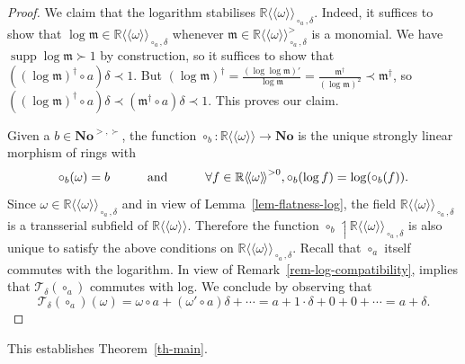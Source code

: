 \documentclass{article}
\newcommand{\llangle}{{\langle\!\langle}}
\newcommand{\of}{:}
\newcommand{\rrangle}{{\rangle\!\rangle}}
\newcommand{\tmop}[1]{\ensuremath{\operatorname{#1}}}
\theoremstyle{remark}\newtheorem*{convention*}{Convention}
\begin{document}
\begin{proof}
  We claim that the logarithm stabilises $\mathbb{R} \llangle \omega
  \rrangle_{\circ_a, \delta}$. Indeed, it suffices to show that $\log
  \mathfrak{m} \in \mathbb{R} \llangle \omega \rrangle_{\circ_a, \delta}$
  whenever $\mathfrak{m} \in \mathbb{R} \llangle \omega \rrangle_{\circ_a,
  \delta}^{>}$ is a monomial. We have $\tmop{supp} \log \mathfrak{m} \succ 1$
  by construction, so it suffices to show that $((\log \mathfrak{m})^{\dag}
  \circ a) \delta \prec 1$. But $(\log \mathfrak{m})^{\dag} = \frac{(\log \log
  \mathfrak{m})'}{\log \mathfrak{m}} = \frac{\mathfrak{m}^{\dag}}{(\log
  \mathfrak{m})^2} \prec \mathfrak{m}^{\dag}$, so $((\log \mathfrak{m})^{\dag}
  \circ a) \delta \prec (\mathfrak{m}^{\dag} \circ a) \delta \prec 1$. This
  proves our claim.
  
  Given a $b \in \mathbf{No}^{>, \succ}$, the function $\mathord{\circ_b} \of
  \mathbb{R} \llangle \omega \rrangle \longrightarrow \mathbf{No}$ is the
  unique strongly linear morphism of rings with
  \[ \mathord{\circ_b} (\omega) = b \text{{\hspace{3em}}and{\hspace{3em}}}
     \forall f \in \mathbb{R} \llangle \omega \rrangle^{> 0},
     \mathord{\circ_b} (\log f) = \log (\mathord{\circ_b} (f)) . \]
  Since $\omega \in \mathbb{R} \llangle \omega \rrangle_{\circ_a, \delta}$ and
  in view of Lemma~\ref{lem-flatness-log}, the field $\mathbb{R} \llangle \omega
  \rrangle_{\circ_a, \delta}$ is a transserial subfield of $\mathbb{R}
  \llangle \omega \rrangle$. Therefore the function $\mathord{\circ_b}
  \upharpoonleft \mathbb{R} \llangle \omega \rrangle_{\circ_a, \delta}$ is
  also unique to satisfy the above conditions on $\mathbb{R} \llangle \omega
  \rrangle_{\circ_a, \delta}$. Recall that $\circ_a$ itself commutes with the
  logarithm. In view of Remark~\ref{rem-log-compatibility},
   implies that $\mathcal{T}_{\delta} (\circ_a)$
  commutes with log. We conclude by observing that
  \[ \mathcal{T}_{\delta} (\circ_a) (\omega) = \omega \circ a + (\omega' \circ
     a) \delta + \cdots = a + 1 \cdot \delta + 0 + 0 + \cdots = a + \delta .
  \]
\end{proof}

This establishes Theorem~\ref{th-main}.
\end{document}
